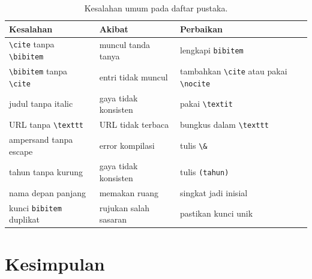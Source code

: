 \documentclass[11pt,a4paper]{article}
\begin{document}
\begin{table}[H]
	\centering
	\caption{Kesalahan umum pada daftar pustaka.}
	\label{tab:ref-mistakes}
	\footnotesize
	\begin{tabularx}{\textwidth}{l X X}
		\toprule
		Kesalahan                                                          & Akibat                & Perbaikan                                                                        \\
		\midrule
		\texttt{\textbackslash cite} tanpa \texttt{\textbackslash bibitem} & muncul tanda tanya    & lengkapi \texttt{bibitem}                                                        \\
		\texttt{\textbackslash bibitem} tanpa \texttt{\textbackslash cite} & entri tidak muncul    & tambahkan \texttt{\textbackslash cite} atau pakai \texttt{\textbackslash nocite} \\
		judul tanpa italic                                                 & gaya tidak konsisten  & pakai \texttt{\textbackslash textit}                                             \\
		URL tanpa \texttt{\textbackslash texttt}                           & URL tidak terbaca     & bungkus dalam \texttt{\textbackslash texttt}                                     \\
		ampersand tanpa escape                                             & error kompilasi       & tulis \texttt{\textbackslash\&}                                                  \\
		tahun tanpa kurung                                                 & gaya tidak konsisten  & tulis \texttt{(tahun)}                                                           \\
		nama depan panjang                                                 & memakan ruang         & singkat jadi inisial                                                             \\
		kunci \texttt{bibitem} duplikat                                    & rujukan salah sasaran & pastikan kunci unik                                                              \\
		\bottomrule
	\end{tabularx}
\end{table}

\section{Kesimpulan}
\end{document}

